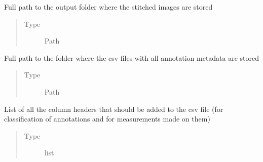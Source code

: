 \documentclass[letterpaper,10pt,english]{sphinxmanual}
\begin{document}
\begin{fulllineitems}
\begin{fulllineitems}
\begin{quote}
\begin{description}
\end{description}\end{quote}

\end{fulllineitems}


\begin{fulllineitems}
\label{\detokenize{index:stitch_MAPS_annotations.Stitcher.output_path}}
Full path to the output folder where the stitched images are stored
\begin{quote}\begin{description}
\item[{Type}] \leavevmode
Path

\end{description}\end{quote}

\end{fulllineitems}


\begin{fulllineitems}
\label{\detokenize{index:stitch_MAPS_annotations.Stitcher.csv_base_path}}
Full path to the folder where the csv files with all annotation metadata are stored
\begin{quote}\begin{description}
\item[{Type}] \leavevmode
Path

\end{description}\end{quote}

\end{fulllineitems}


\begin{fulllineitems}
\label{\detokenize{index:stitch_MAPS_annotations.Stitcher.base_header}}
List of all the column headers that should be added to the csv file (for classification of
annotations and for measurements made on them)
\begin{quote}\begin{description}
\item[{Type}] \leavevmode
list


\end{description}
\end{quote}
\end{fulllineitems}
\end{fulllineitems}
\end{document}
